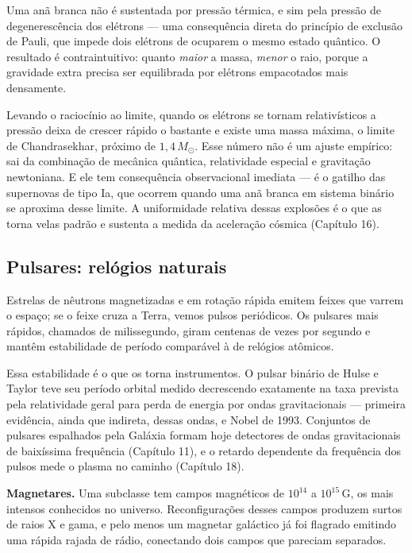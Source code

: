 \documentclass[11pt,a4paper]{article}
\begin{document}
Uma anã branca não é sustentada por pressão térmica, e sim pela pressão de degenerescência dos elétrons --- uma consequência direta do princípio de exclusão de Pauli, que impede dois elétrons de ocuparem o mesmo estado quântico. O resultado é contraintuitivo: quanto \emph{maior} a massa, \emph{menor} o raio, porque a gravidade extra precisa ser equilibrada por elétrons empacotados mais densamente.

Levando o raciocínio ao limite, quando os elétrons se tornam relativísticos a pressão deixa de crescer rápido o bastante e existe uma massa máxima, o limite de Chandrasekhar, próximo de $1{,}4\,M_\odot$. Esse número não é um ajuste empírico: sai da combinação de mecânica quântica, relatividade especial e gravitação newtoniana. E ele tem consequência observacional imediata --- é o gatilho das supernovas de tipo Ia, que ocorrem quando uma anã branca em sistema binário se aproxima desse limite. A uniformidade relativa dessas explosões é o que as torna velas padrão e sustenta a medida da aceleração cósmica (Capítulo 16).

\subsection*{Pulsares: relógios naturais}

Estrelas de nêutrons magnetizadas e em rotação rápida emitem feixes que varrem o espaço; se o feixe cruza a Terra, vemos pulsos periódicos. Os pulsares mais rápidos, chamados de milissegundo, giram centenas de vezes por segundo e mantêm estabilidade de período comparável à de relógios atômicos.

Essa estabilidade é o que os torna instrumentos. O pulsar binário de Hulse e Taylor teve seu período orbital medido decrescendo exatamente na taxa prevista pela relatividade geral para perda de energia por ondas gravitacionais --- primeira evidência, ainda que indireta, dessas ondas, e Nobel de 1993. Conjuntos de pulsares espalhados pela Galáxia formam hoje detectores de ondas gravitacionais de baixíssima frequência (Capítulo 11), e o retardo dependente da frequência dos pulsos mede o plasma no caminho (Capítulo 18).

\textbf{Magnetares.} Uma subclasse tem campos magnéticos de $10^{14}$ a $10^{15}\,\mathrm{G}$, os mais intensos conhecidos no universo. Reconfigurações desses campos produzem surtos de raios X e gama, e pelo menos um magnetar galáctico já foi flagrado emitindo uma rápida rajada de rádio, conectando dois campos que pareciam separados.
\end{document}
